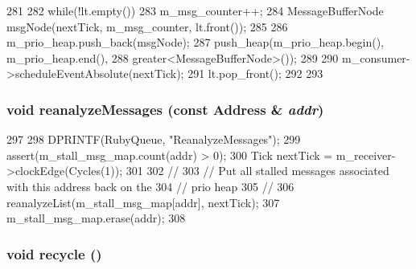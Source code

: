 \begin{DoxyCode}
281 {
282     while(!lt.empty()) {
283         m_msg_counter++;
284         MessageBufferNode msgNode(nextTick, m_msg_counter, lt.front());
285 
286         m_prio_heap.push_back(msgNode);
287         push_heap(m_prio_heap.begin(), m_prio_heap.end(),
288                   greater<MessageBufferNode>());
289 
290         m_consumer->scheduleEventAbsolute(nextTick);
291         lt.pop_front();
292     }
293 }
\end{DoxyCode}
\hypertarget{classMessageBuffer_ac8fc02d2f80c73a67e76577139daaaf9}{
\subsubsection[{reanalyzeMessages}]{\setlength{\rightskip}{0pt plus 5cm}void reanalyzeMessages (const {\bf Address} \& {\em addr})}}
\label{classMessageBuffer_ac8fc02d2f80c73a67e76577139daaaf9}



\begin{DoxyCode}
297 {
298     DPRINTF(RubyQueue, "ReanalyzeMessages\n");
299     assert(m_stall_msg_map.count(addr) > 0);
300     Tick nextTick = m_receiver->clockEdge(Cycles(1));
301 
302     //
303     // Put all stalled messages associated with this address back on the
304     // prio heap
305     //
306     reanalyzeList(m_stall_msg_map[addr], nextTick);
307     m_stall_msg_map.erase(addr);
308 }
\end{DoxyCode}
\hypertarget{classMessageBuffer_a98102238652df03cf871c9766de96af2}{
\subsubsection[{recycle}]{\setlength{\rightskip}{0pt plus 5cm}void recycle ()}}
\label{classMessageBuffer_a98102238652df03cf871c9766de96af2}




